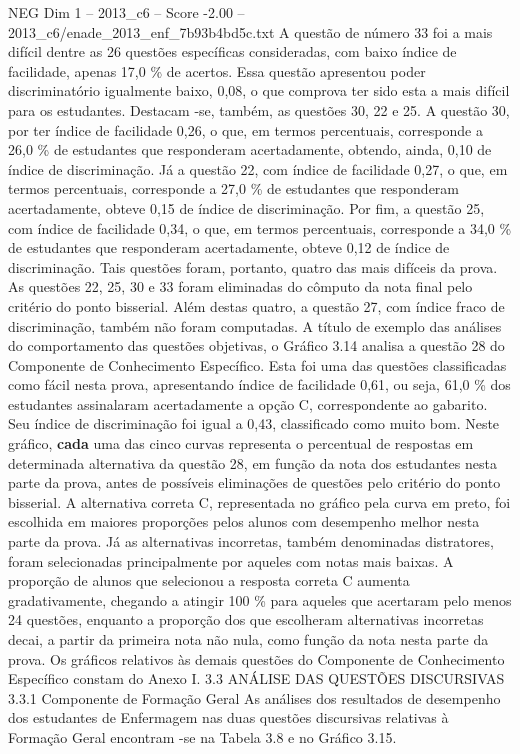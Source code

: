 \begin{textsample}{NEG Dim 1 – 2013\_c6 – Score -2.00 – 2013\_c6/enade\_2013\_enf\_7b93b4bd5c.txt}
A questão de número 33 foi a mais difícil dentre as 26 questões específicas consideradas, com baixo índice de facilidade, apenas 17,0 \% de acertos.
Essa questão apresentou poder discriminatório igualmente baixo, 0,08, o que comprova ter sido esta a mais difícil para os estudantes.
Destacam -se, também, as questões 30, 22 e 25.
A questão 30, por ter índice de facilidade 0,26, o que, em termos percentuais, corresponde a 26,0 \% de estudantes que responderam acertadamente, obtendo, ainda, 0,10 de índice de discriminação.
Já a questão 22, com índice de facilidade 0,27, o que, em termos percentuais, corresponde a 27,0 \% de estudantes que responderam acertadamente, obteve 0,15 de índice de discriminação.
Por fim, a questão 25, com índice de facilidade 0,34, o que, em termos percentuais, corresponde a 34,0 \% de estudantes que responderam acertadamente, obteve 0,12 de índice de discriminação.
Tais questões foram, portanto, quatro das mais difíceis da prova.
As questões 22, 25, 30 e 33 foram eliminadas do cômputo da nota final pelo critério do ponto bisserial.
Além destas quatro, a questão 27, com índice fraco de discriminação, também não foram computadas.
A título de exemplo das análises do comportamento das questões objetivas, o Gráfico 3.14 analisa a questão 28 do Componente de Conhecimento Específico.
Esta foi uma das questões classificadas como fácil nesta prova, apresentando índice de facilidade 0,61, ou seja, 61,0 \% dos estudantes assinalaram acertadamente a opção C, correspondente ao gabarito.
Seu índice de discriminação foi igual a 0,43, classificado como muito bom.
Neste gráfico, \textbf{cada} uma das cinco curvas representa o percentual de respostas em determinada alternativa da questão 28, em função da nota dos estudantes nesta parte da prova, antes de possíveis eliminações de questões pelo critério do ponto bisserial.
A alternativa correta C, representada no gráfico pela curva em preto, foi escolhida em maiores proporções pelos alunos com desempenho melhor nesta parte da prova.
Já as alternativas incorretas, também denominadas distratores, foram selecionadas principalmente por aqueles com notas mais baixas.
A proporção de alunos que selecionou a resposta correta C aumenta gradativamente, chegando a atingir 100 \% para aqueles que acertaram pelo menos 24 questões, enquanto a proporção dos que escolheram alternativas incorretas decai, a partir da primeira nota não nula, como função da nota nesta parte da prova.
Os gráficos relativos às demais questões do Componente de Conhecimento Específico constam do Anexo I. 3.3 ANÁLISE DAS QUESTÕES DISCURSIVAS 3.3.1 Componente de Formação Geral As análises dos resultados de desempenho dos estudantes de Enfermagem nas duas questões discursivas relativas à Formação Geral encontram -se na Tabela 3.8 e no Gráfico 3.15.

\end{textsample}
